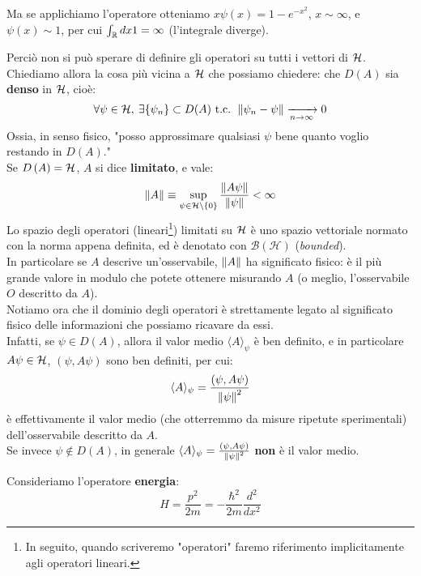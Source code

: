 \documentclass[FisicaTeorica.tex]{subfiles}
\begin{document}
\begin{enumerate}
\begin{es}
	Ma se applichiamo l'operatore otteniamo $x\psi \left(x\right)=1-e^{-x^2}$, $x\sim \infty$, e $\psi \left(x\right)\sim 1$, per cui $\int_{\mathbb{R}} dx 1=\infty$ (l'integrale diverge).
	\end{es}
	Perciò non si può sperare di definire gli operatori su tutti i vettori di $\mathcal{H}$.\\
	Chiediamo allora la cosa più vicina a $\mathcal{H}$ che possiamo chiedere: che $D\left(A\right)$ sia \textbf{denso} in $\mathcal{H}$, cioè:
	\[
	\forall \psi \in \mathcal{H},\> \exists \{\psi_n\} \subset D(A) \text{ t.c. } \left\lVert\psi_n -\psi\right\rVert \xrightarrow[n\to\infty]{} 0
	\]
	Ossia, in senso fisico, "posso approssimare qualsiasi $\psi$  bene quanto voglio restando in $D(A)$."\\
	
	Se $D\left(A\right)=\mathcal{H}$, $A$ si dice \textbf{limitato}, e vale:
	\[
	\left\lVert A\right\rVert \equiv \sup_{\psi \in \mathcal{H} \setminus \{0\}} \frac{\left\lVert A\psi\right\rVert}{\left\lVert\psi\right\rVert} < \infty
	\]
	Lo spazio degli operatori (lineari\footnote{In seguito, quando scriveremo "operatori" faremo riferimento implicitamente agli operatori lineari.}) limitati su $\mathcal{H}$ è uno spazio vettoriale normato con la norma appena definita, ed è denotato con $\mathcal{B}\left(\mathcal{H}\right)$ (\textit{bounded}).\\
	In particolare se $A$ descrive un'osservabile, $\left\lVert A\right\rVert$ ha significato fisico: è il più grande valore in modulo che potete ottenere misurando $A$ (o meglio, l'osservabile $O$ descritto da $A$).\\
	Notiamo ora che il dominio degli operatori è strettamente legato al significato fisico delle informazioni che possiamo ricavare da essi.\\
	Infatti, se $\psi \in D(A)$, allora il valor medio $\langle A\rangle_\psi$ è ben definito, e in particolare $A\psi\in \mathcal{H}$, $(\psi, A\psi)$ sono ben definiti, per cui: 
	\[
	\langle A \rangle_\psi = \frac{(\psi,A\psi)}{\left\lVert\psi\right\rVert^2}
	\]
	è effettivamente il valor medio (che otterremmo da misure ripetute sperimentali) dell'osservabile descritto da $A$.\\
	Se invece $\psi \notin D(A)$, in generale $\langle A\rangle_\psi = \frac{(\psi, A\psi)}{\left\lVert\psi\right\rVert^2}$ \textbf{non} è il valor medio.\\
	\begin{es}
	Consideriamo l'operatore \textbf{energia}: 
	\[H=\frac{p^2}{2m}=-\frac{\hbar^2}{2m}\frac{d^2}{dx^2}\]

\end{es}
\end{enumerate}
\end{document}
